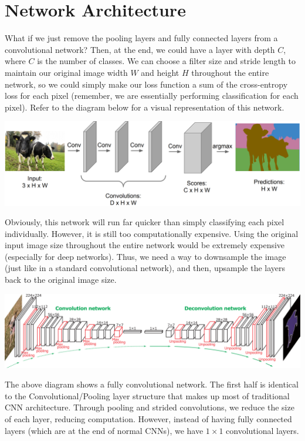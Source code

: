 \documentclass{article}
\begin{document}
\section{Network Architecture}

What if we just remove the pooling layers and fully connected layers from a convolutional network? Then, at the end, we could have a layer with depth $C$, where $C$ is the number of classes. We can choose a filter size and stride length to maintain our original image width $W$ and height $H$ throughout the entire network, so we could simply make our loss function a sum of the cross-entropy loss for each pixel (remember, we are essentially performing classification for each pixel). Refer to the diagram below for a visual representation of this network.

\begin{center}
\includegraphics[scale=0.35]{fullyconv.PNG}
\end{center}

Obviously, this network will run far quicker than simply classifying each pixel individually. However, it is still too computationally expensive. Using the original input image size throughout the entire network would be extremely expensive (especially for deep networks). Thus, we need a way to downsample the image (just like in a standard convolutional network), and then, upsample the layers back to the original image size.


\begin{center}
\includegraphics[scale=0.45]{structure.png}
\end{center}

The above diagram shows a fully convolutional network. The first half is identical to the Convolutional/Pooling layer structure that makes up most of traditional CNN architecture. Through pooling and strided convolutions, we reduce the size of each layer, reducing computation. However, instead of having fully connected layers (which are at the end of normal CNNs), we have $1\times1$ convolutional layers.
\end{document}
